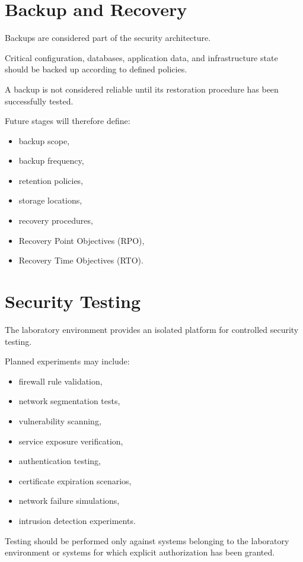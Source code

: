 \newpage
\section{Backup and Recovery}

Backups are considered part of the security architecture.

Critical configuration, databases, application data, and infrastructure
state should be backed up according to defined policies.

A backup is not considered reliable until its restoration procedure has
been successfully tested.

Future stages will therefore define:

\begin{itemize}
    \item backup scope,
    \item backup frequency,
    \item retention policies,
    \item storage locations,
    \item recovery procedures,
    \item Recovery Point Objectives (RPO),
    \item Recovery Time Objectives (RTO).
\end{itemize}


\section{Security Testing}

The laboratory environment provides an isolated platform for controlled
security testing.

Planned experiments may include:

\begin{itemize}
    \item firewall rule validation,
    \item network segmentation tests,
    \item vulnerability scanning,
    \item service exposure verification,
    \item authentication testing,
    \item certificate expiration scenarios,
    \item network failure simulations,
    \item intrusion detection experiments.
\end{itemize}

Testing should be performed only against systems belonging to the laboratory
environment or systems for which explicit authorization has been granted.


